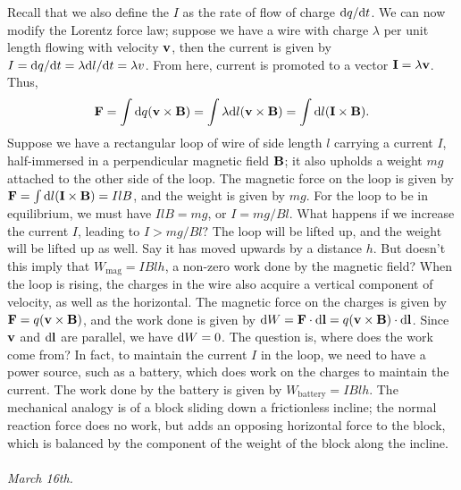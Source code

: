 Recall that we also define the  $I$ as the rate of flow of charge $\mathrm{d}q/\mathrm{d}t$. We can now modify the Lorentz force law; suppose we have a wire with charge $\lambda$ per unit length flowing with velocity $\mathbf{v}$, then the current is given by $I = \mathrm{d}q/\mathrm{d}t = \lambda \mathrm{d}l/\mathrm{d}t = \lambda v$. From here, current is promoted to a vector $\mathbf{I} = \lambda \mathbf{v}$. Thus,
\begin{align}
    \mathbf{F} = \int \mathrm{d}q (\mathbf{v} \times \mathbf{B}) = \int \lambda \mathrm{d}l (\mathbf{v} \times \mathbf{B}) = \int \mathrm{d}l (\mathbf{I} \times \mathbf{B}).
\end{align}
Suppose we have a rectangular loop of wire of side length $l$ carrying a current $I$, half-immersed in a perpendicular magnetic field $\mathbf{B}$; it also upholds a weight $mg$ attached to the other side of the loop. The magnetic force on the loop is given by $\mathbf{F} = \int \mathrm{d}l (\mathbf{I} \times \mathbf{B}) = I l B$, and the weight is given by $mg$. For the loop to be in equilibrium, we must have $I l B = mg$, or $I = mg/Bl$. What happens if we increase the current $I$, leading to $I > mg/Bl?$ The loop will be lifted up, and the weight will be lifted up as well. Say it has moved upwards by a distance $h$. But doesn't this imply that $W_{\text{mag}} = IBlh$, a non-zero work done by the magnetic field? When the loop is rising, the charges in the wire also acquire a vertical component of velocity, as well as the horizontal. The magnetic force on the charges is given by $\mathbf{F} = q (\mathbf{v} \times \mathbf{B})$, and the work done is given by $\mathrm{d}W = \mathbf{F} \cdot \mathrm{d}\mathbf{l} = q (\mathbf{v} \times \mathbf{B}) \cdot \mathrm{d}\mathbf{l}$. Since $\mathbf{v}$ and $\mathrm{d}\mathbf{l}$ are parallel, we have $\mathrm{d}W = 0$. The question is, where does the work come from? In fact, to maintain the current $I$ in the loop, we need to have a power source, such as a battery, which does work on the charges to maintain the current. The work done by the battery is given by $W_{\text{battery}} = IBlh$. The mechanical analogy is of a block sliding down a frictionless incline; the normal reaction force does no work, but adds an opposing horizontal force to the block, which is balanced by the component of the weight of the block along the incline.
\\ \\
\textit{March 16th.}

